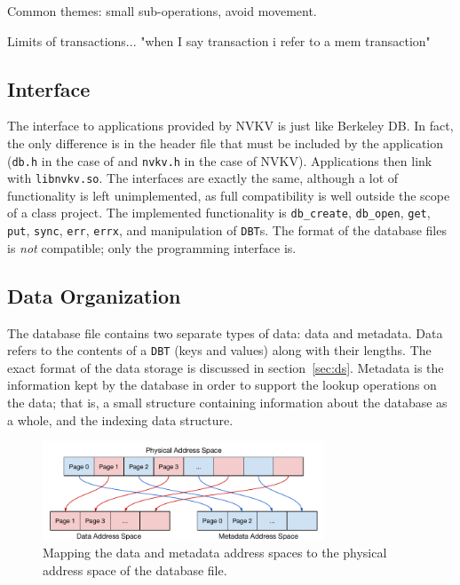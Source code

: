 Common themes: small sub-operations, avoid movement.

Limits of transactions... "when I say transaction i refer to a mem transaction"

\subsection{Interface}

The interface to applications provided by NVKV is just like Berkeley DB. In
fact, the only difference is in the header file that must be included by the
application (\texttt{db.h} in the case of \bdb and \texttt{nvkv.h} in the case
of NVKV). Applications then link with \texttt{libnvkv.so}. The interfaces are
exactly the same, although a lot of functionality is left unimplemented, as full
compatibility is well outside the scope of a class project. The implemented
functionality is \texttt{db\_create}, \texttt{db\_open}, \texttt{get},
\texttt{put}, \texttt{sync}, \texttt{err}, \texttt{errx}, and manipulation of
\texttt{DBT}s. The format of the database files is \textit{not} compatible; only
the programming interface is.

\subsection{Data Organization}

The database file contains two separate types of data: data and metadata. Data
refers to the contents of a \texttt{DBT} (keys and values) along with their
lengths. The exact format of the data storage is discussed in
section~\ref{sec:ds}. Metadata is the information kept by the database in order
to support the lookup operations on the data; that is, a small structure
containing information about the database as a whole, and the indexing data
structure.

\begin{figure}
\centering
\hspace*{-0.1in}
\includegraphics[width=84mm]{fig/addrspace}
\caption{Mapping the data and metadata address spaces to the physical address
space of the database file.}
\label{fig:addrspace}
\end{figure}

